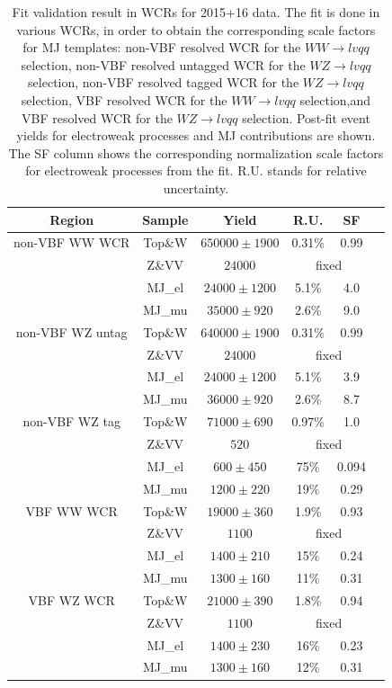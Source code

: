 \begin{table}[ht]
    \centering
     \begin{tabular}{|c|c|c|cc|c|}
      \hline
     Region &Sample    & Yield   & R.U.    & SF    \\ \hline
     non-VBF WW WCR & Top\&W    & $650000\pm 1900$  & 0.31\%  & 0.99  \\ 
     &Z\&VV     & $24000$ & \multicolumn{2}{c|}{fixed} \\ 
     &MJ\_el    & $24000\pm 1200$  & 5.1\%  &4.0   \\ 
     &MJ\_mu    & $35000\pm 920$  & 2.6\%  &9.0  \\     
      \hline
     non-VBF WZ untag & Top\&W    & $640000\pm 1900$  & 0.31\%  & 0.99  \\
     &Z\&VV     & $24000$ & \multicolumn{2}{c|}{fixed} \\ 
     &MJ\_el    & $24000\pm 1200$  & 5.1\%  &3.9   \\
     &MJ\_mu    & $36000\pm 920$  & 2.6\%  &8.7   \\ 
      \hline
     non-VBF WZ tag&Top\&W    & $71000\pm 690$  & 0.97\%  & 1.0  \\ 
     &Z\&VV     & $520$ & \multicolumn{2}{c|}{fixed} \\ 
     &MJ\_el    & $600\pm 450$  & 75\%  &0.094   \\
     &MJ\_mu    & $1200\pm 220$  & 19\%  &0.29   \\   
      \hline
     VBF WW WCR & Top\&W    & $19000\pm 360$  & 1.9\%  & 0.93  \\ 
     &Z\&VV     & $1100$ & \multicolumn{2}{c|}{fixed} \\ 
     &MJ\_el    & $1400\pm 210$  & 15\%  &0.24   \\ 
     &MJ\_mu    & $1300\pm 160$  & 11\%  &0.31   \\ 
      \hline
     VBF WZ WCR & Top\&W    & $21000\pm 390$  & 1.8\%  & 0.94  \\
     &Z\&VV     & $1100$ & \multicolumn{2}{c|}{fixed} \\
     &MJ\_el    & $1400\pm 230$  & 16\%  &0.23   \\ 
     &MJ\_mu    & $1300\pm 160$  & 12\%  &0.31   \\ 
     \hline
     \end{tabular}\hfill%
     \\
\caption{\label{tab:template_validation_CR} Fit validation result in WCRs for 2015+16 data. 
The fit is done in various WCRs, in order to obtain the corresponding scale factors for MJ templates: non-VBF resolved WCR for the $WW\to lvqq$ selection, non-VBF resolved untagged WCR for the $WZ\to lvqq$ selection,  non-VBF resolved tagged WCR for the $WZ\to lvqq$ selection,  VBF resolved WCR for the $WW\to lvqq$ selection,and VBF resolved WCR for the $WZ\to lvqq$ selection. Post-fit event yields for electroweak processes and MJ contributions are shown. The SF column shows the corresponding normalization scale factors for electroweak processes from the fit.
R.U. stands for relative uncertainty.
}
\end{table}



